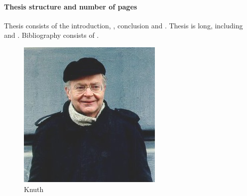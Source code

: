 \paragraph*{Thesis structure and number of pages}
Thesis consists of the introduction,
,
conclusion and 
.
Thesis is 
 long, including
 and
.
Bibliography consists of
.



\begin{figure}
    \centering
    \includegraphics[width=0.6\linewidth]{images/knuth}
    \caption{Knuth}
    \label{fig:my_label}
\end{figure}